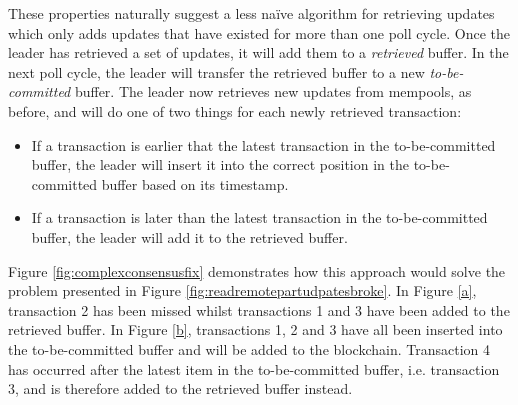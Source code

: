 \documentclass[12pt,a4paper,twoside,openright]{report}
\begin{document}
	These properties naturally suggest a less na{\"i}ve algorithm for retrieving updates which only adds updates that have existed for more than one poll cycle.
	Once the leader has retrieved a set of updates, it will add them to a \textit{retrieved} buffer.
	In the next poll cycle, the leader will transfer the retrieved buffer to a new \textit{to-be-committed} buffer.
	The leader now retrieves new updates from mempools, as before, and will do one of two things for each newly retrieved transaction:
	\begin{itemize}
		\item If a transaction is earlier that the latest transaction in the to-be-committed buffer, the leader will insert it into the correct position in the to-be-committed buffer based on its timestamp.
		\item If a transaction is later than the latest transaction in the to-be-committed buffer, the leader will add it to the retrieved buffer.
	\end{itemize}
	Figure \ref{fig:complexconsensusfix} demonstrates how this approach would solve the problem presented in Figure \ref{fig:readremotepartudpatesbroke}.
	In Figure \ref{a}, transaction 2 has been missed whilst transactions 1 and 3 have been added to the retrieved buffer. 
	In Figure \ref{b}, transactions 1, 2 and 3 have all been inserted into the to-be-committed buffer and will be added to the blockchain.
	Transaction 4 has occurred after the latest item in the to-be-committed buffer, i.e. transaction 3, and is therefore added to the retrieved buffer instead. \\
\end{document}
